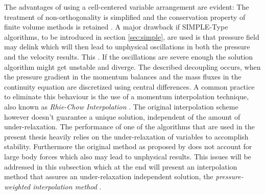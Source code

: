   The advantages of using a cell-centered variable arrangement are evident: The treatment of non-orthogonality is simplified and the conservation property of finite volume methods is retained \cite{choi99,majumdar88,miller88,zhang14}. A major drawback if SIMPLE-Type algorithms, to be introduced in section \ref{sec:simple}, are used is that pressure field may delink which will then lead to unphysical oscillations in both the pressure and the velocity results. This . If the oscillations are severe enough the solution algorithm might get unstable and diverge. The described decoupling occurs, when the pressure gradient in the momentum balances and the mass fluxes in the continuity equation are discretized using central differences. A common practice to eliminate this behaviour is the use of a momentum interpolation technique, also known as \emph{Rhie-Chow Interpolation} \cite{rhie82}. The original interpolation scheme however doesn't guarantee a unique solution, independent of the amount of under-relaxation. The performance of one of the algorithms that are used in the present thesis heavily relies on the under-relaxation of variables to accomplish stability. Furthermore the original method as proposed by \cite{rhie82} does not account for large body forces which also may lead to unphysical results. This issues will be addressed in this subsection which at the end will present an interpolation method that assures an under-relaxation independent solution, the \emph{pressure-weighted interpolation method} \cite{miller88}.

